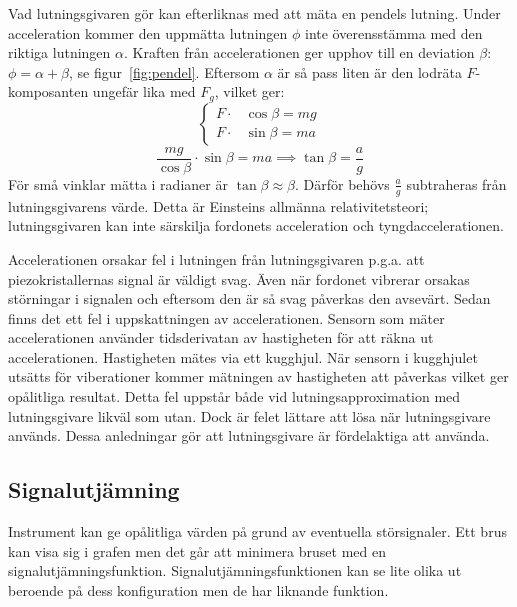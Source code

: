 Vad lutningsgivaren gör kan efterliknas med att mäta en pendels lutning.
Under acceleration kommer den uppmätta lutningen $\phi$
inte överensstämma med den riktiga lutningen $\alpha$.
Kraften från accelerationen ger upphov till en deviation $\beta$:
$ \phi = \alpha + \beta $, se figur~\ref{fig:pendel}.
Eftersom $\alpha$ är så pass liten är den lodräta $F$-komposanten
ungefär lika med $F_g$, vilket ger:
\begin{equation}
	\left\{ \begin{aligned}
		F \cdot &\cos \beta = mg \\
		F \cdot &\sin \beta = ma
	\end{aligned} \right.
\end{equation}
\begin{equation}
	\frac{mg}{\cos \beta} \cdot \sin \beta = ma \implies \tan \beta = \frac{a}{g}
\end{equation}
För små vinklar mätta i radianer är $ \tan \beta \approx \beta $.
Därför behövs $ \frac{a}{g} $ subtraheras från lutningsgivarens värde.
Detta är Einsteins allmänna relativitetsteori;
lutningsgivaren kan inte särskilja fordonets acceleration och tyngdaccelerationen.

Accelerationen orsakar fel i lutningen från lutningsgivaren p.g.a. att
piezokristallernas signal är väldigt svag.
Även när fordonet vibrerar orsakas störningar i signalen och eftersom den är så svag
påverkas den avsevärt.
Sedan finns det ett fel i uppskattningen av accelerationen.
Sensorn som mäter accelerationen använder tidsderivatan av hastigheten för
att räkna ut accelerationen.
Hastigheten mätes via ett kugghjul.
När sensorn i kugghjulet utsätts för viberationer kommer mätningen av
hastigheten att påverkas vilket ger opålitliga resultat.
Detta fel uppstår både vid lutningsapproximation med lutningsgivare likväl som utan.
Dock är felet lättare att lösa när lutningsgivare används.
Dessa anledningar gör att lutningsgivare är fördelaktiga att använda.
\autocite{lauri17}

\subsection{Signalutjämning} 
Instrument kan ge opålitliga värden på grund av eventuella störsignaler.
Ett brus kan visa sig i grafen men det går att minimera bruset med en signalutjämningsfunktion. 
Signalutjämningsfunktionen kan se lite olika ut beroende på dess konfiguration
 men de har liknande funktion. 

